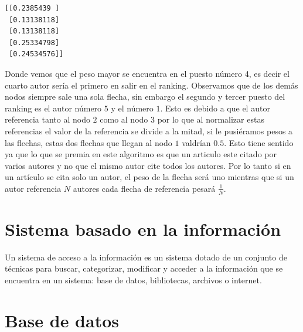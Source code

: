 \documentclass[size=a4, parskip=half, titlepage=false, toc=flat, toc=bib, 12pt]{scrartcl}
\theoremstyle{theorem-style}
\theoremstyle{definition-style}
\theoremstyle{remark-style}
\theoremstyle{example-style}
\theoremstyle{definition-style}
\theoremstyle{remark-style}
\begin{document}
\begin{verbatim}
[[0.2385439 ]
 [0.13138118]
 [0.13138118]
 [0.25334798]
 [0.24534576]]
\end{verbatim}

Donde vemos que el peso mayor se encuentra en el puesto número 4, es decir el cuarto autor sería el
primero en salir en el ranking. Observamos que de los demás nodos siempre sale una sola flecha, sin
embargo el segundo y tercer puesto del ranking es el autor número $5$ y el número $1$. Esto es debido
a que el autor referencia tanto al nodo $2$ como al nodo $3$ por lo que al normalizar estas
referencias el valor de la referencia se divide a la mitad, si le pusiéramos pesos a las flechas,
estas dos flechas que llegan al nodo $1$ valdrían $0.5$. Esto tiene sentido ya que lo que se premia
en este algoritmo es que un articulo este citado por varios autores y no que el mismo autor cite todos
los autores. Por lo tanto si en un artículo se cita solo un autor, el peso de la flecha será uno
mientras que si un autor referencia $N$ autores cada flecha de referencia pesará $\frac{1}{N}$.

\section{Sistema basado en la información}
Un sistema de acceso a la información es un sistema dotado de un conjunto de técnicas para buscar, categorizar, modificar y acceder a la información que se encuentra en un sistema: base de datos, bibliotecas, archivos o internet.

\section{Base de datos}
\end{document}
